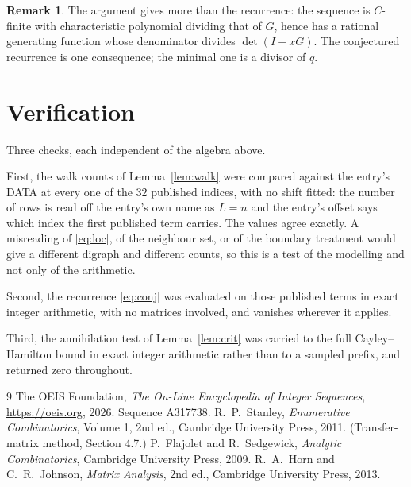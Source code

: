 \documentclass[11pt,a4paper]{article}
\theoremstyle{plain}
\theoremstyle{definition}
\newtheorem{remark}[theorem]{Remark}
\begin{document}
\begin{remark}
The argument gives more than the recurrence: the sequence is $C$-finite with characteristic
polynomial dividing that of $G$, hence has a rational generating function whose denominator
divides $\det(I-xG)$. The conjectured recurrence is one consequence; the minimal one is a
divisor of $q$.
\end{remark}

\section{Verification}

Three checks, each independent of the algebra above.

First, the walk counts of Lemma~\ref{lem:walk} were compared against the entry's DATA at
every one of the $32$ published indices, with no shift fitted: the number of rows is
read off the entry's own name as $L=n$ and the entry's offset says which index the first
published term carries. The values agree exactly. A misreading of \eqref{eq:loc}, of the
neighbour set, or of the boundary treatment would give a different digraph and different
counts, so this is a test of the modelling and not only of the arithmetic.

Second, the recurrence \eqref{eq:conj} was evaluated on those published terms in exact
integer arithmetic, with no matrices involved, and vanishes wherever it applies.

Third, the annihilation test of Lemma~\ref{lem:crit} was carried to the full
Cayley--Hamilton bound in exact integer arithmetic rather than to a sampled prefix, and
returned zero throughout.

\begin{thebibliography}{9}
 The OEIS Foundation, \emph{The On-Line Encyclopedia of Integer
Sequences}, \url{https://oeis.org}, 2026. Sequence A317738.
 R.~P.~Stanley, \emph{Enumerative Combinatorics}, Volume 1, 2nd ed.,
Cambridge University Press, 2011. (Transfer-matrix method, Section 4.7.)
 P.~Flajolet and R.~Sedgewick, \emph{Analytic Combinatorics}, Cambridge
University Press, 2009.
 R.~A.~Horn and C.~R.~Johnson, \emph{Matrix Analysis}, 2nd ed., Cambridge
University Press, 2013.
\end{thebibliography}
\end{document}
